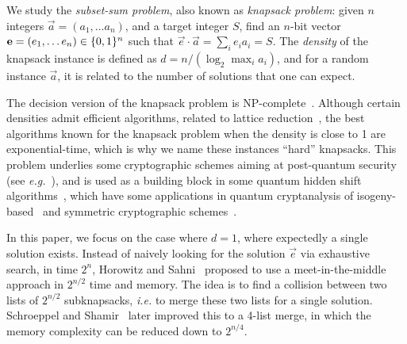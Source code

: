 

We study the \emph{subset-sum problem}, also known as \emph{knapsack problem}: given $n$ integers $\vec{a} = (a_1, \ldots a_n)$, and a target integer $S$, find an $n$-bit vector $\mathbf{e} = (e_1, \ldots e_n) \in \{0,1\}^n$ such that $\vec{e} \cdot \vec{a} = \sum_i e_i a_i = S$. The \emph{density} of the knapsack instance is defined as $d = n / (\log_2 \max_i a_i)$, and for a random instance $\vec{a}$, it is related to the number of solutions that one can expect.

The decision version of the knapsack problem is NP-complete~\cite{DBLP:books/fm/GareyJ79}. Although certain densities admit efficient algorithms, related to lattice reduction~\cite{DBLP:conf/focs/LagariasO83,DBLP:conf/approx/Lyubashevsky05}, the best algorithms known for the knapsack problem when the density is close to 1 are  exponential-time, which is why we name these instances ``hard'' knapsacks. This problem underlies some cryptographic schemes aiming at post-quantum security (see \emph{e.g.}~\cite{DBLP:conf/tcc/LyubashevskyPS10}), 
and is used as a building block in some quantum hidden shift algorithms~\cite{Arxiv:Bonnetain19}, which have some applications in quantum cryptanalysis of isogeny-based~\cite{BonSch20} and symmetric cryptographic schemes~\cite{DBLP:conf/asiacrypt/BonnetainN18}. %

In this paper, we focus on the case where $d = 1$, where expectedly a single solution exists. Instead of naively looking for the solution $\vec{e}$ via exhaustive search, in time $2^n$, Horowitz and Sahni~\cite{DBLP:journals/jacm/HorowitzS74} proposed to use a meet-in-the-middle approach in $2^{n/2}$ time and memory. The idea is to find a collision between two lists of $2^{n/2}$ subknapsacks, \emph{i.e.} to merge these two lists for a single solution. Schroeppel and Shamir~\cite{DBLP:journals/siamcomp/SchroeppelS81} later improved this to a 4-list merge, in which the memory complexity can be reduced down to $2^{n/4}$.

